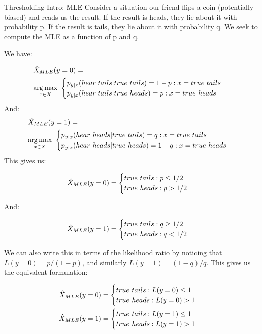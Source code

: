 \begin{exmp}{Thresholding Intro: MLE}{}
Consider a situation our friend flips a coin (potentially biased) and reads us the result. If the result is heads, they lie about it with probability p. If the result is tails, they lie about it with probability q. We seek to compute the MLE as a function of p and q. \newline 

We have:

\begin{align*}
  &\MLE (y=0) = \\
  &\underset{x\in X}{\argmax}\ 
\begin{cases}
	p_{y|x}(hear\ tails|true\ tails) = 1-p :x=true \ tails \\
	p_{y|x}(hear\ tails|true\ heads) = p :x=true\ heads
\end{cases} 
\end{align*}
And:
\begin{align*}
  &\MLE (y=1) = \\
  &\underset{x\in X}{\argmax}\ 
\begin{cases}
	p_{y|x}(hear\ heads|true\ tails) = q :x=true \ tails \\
	p_{y|x}(hear\ heads|true\ heads) = 1-q :x=true\ heads
\end{cases} 
\end{align*}
This gives us:

\begin{align*}
  {\hat{X}_{MLE}} (y=0) =
  \begin{cases}
	true\ tails : p \leq 1/2 \\
	true\ heads : p > 1/2
	\end{cases} 
\end{align*}

And:

\begin{align*}
  {\hat{X}_{MLE}} (y=1) =
  \begin{cases}
	true\ tails : q \geq 1/2 \\
	true\ heads : q < 1/2
	\end{cases} 
\end{align*}

We can also write this in terms of the likelihood ratio by noticing that \(L(y=0) = p/(1-p)\), and similarly \(L(y=1) = (1-q)/q\). This gives us the equivalent formulation:

\begin{align*}
  {\hat{X}_{MLE}} (y=0) =
  \begin{cases}
	true\ tails : L(y=0) \leq 1 \\
	true\ heads : L(y=0) > 1
	\end{cases} 
\\
  {\hat{X}_{MLE}} (y=1) =
  \begin{cases}
	true\ tails : L(y=1) \leq 1 \\
	true\ heads : L(y=1) > 1
	\end{cases} 
\end{align*}


\end{exmp}
